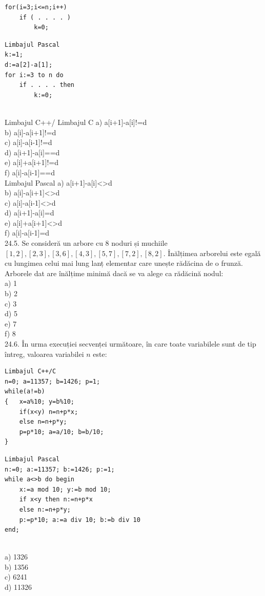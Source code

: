 {{\begin{verbatim}
for(i=3;i<=n;i++)
    if ( . . . . )
        k=0;
\end{verbatim}
\begin{verbatim}
Limbajul Pascal
k:=1;
d:=a[2]-a[1];
for i:=3 to n do
    if . . . . then
        k:=0;
\end{verbatim}
\\
Limbajul C++/ Limbajul C
a) a[i+1]-a[i]!=d
\\
b) a[i]-a[i+1]!=d
\\
c) a[i]-a[i-1]!=d
\\
d) a[i+1]-a[i]==d
\\
e) a[i]+a[i+1]!=d
\\
f) a[i]-a[i-1]==d
\\
Limbajul Pascal
a) a[i+1]-a[i]<>d
\\
b) a[i]-a[i+1]<>d
\\
c) a[i]-a[i-1]<>d
\\
d) a[i+1]-a[i]=d
\\
e) a[i]+a[i+1]<>d
\\
f) a[i]-a[i-1]=d
\\
24.5. Se consideră un arbore cu 8 noduri și muchiile $[1,2],[2,3],[3,6],[4,3],[5,7],[7,2],[8,2]$. Înălțimea arborelui este egală cu lungimea celui mai lung lanț elementar care unește rădăcina de o frunză. Arborele dat are înălțime minimă dacă se va alege ca rădăcină nodul:
\\
a) 1
\\
b) 2
\\
c) 3
\\
d) 5
\\
e) 7
\\
f) 8
\\
24.6. În urma execuției secvenței următoare, în care toate variabilele sunt de tip întreg, valoarea variabilei $n$ este:
\begin{verbatim}
Limbajul C++/C
n=0; a=11357; b=1426; p=1;
while(a!=b)
{   x=a%10; y=b%10;
    if(x<y) n=n+p*x;
    else n=n+p*y;
    p=p*10; a=a/10; b=b/10;
}
\end{verbatim}
\begin{verbatim}
Limbajul Pascal
n:=0; a:=11357; b:=1426; p:=1;
while a<>b do begin
    x:=a mod 10; y:=b mod 10;
    if x<y then n:=n+p*x
    else n:=n+p*y;
    p:=p*10; a:=a div 10; b:=b div 10
end;
\end{verbatim}
\\
a) 1326
\\
b) 1356
\\
c) 6241
\\
d) 11326
}}

